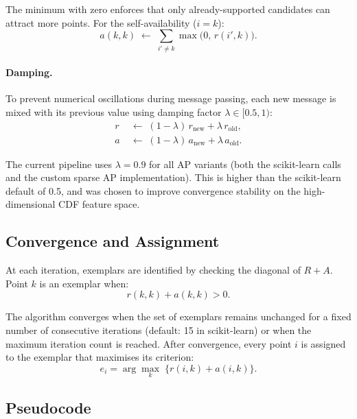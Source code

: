\documentclass[11pt]{article}
\begin{document}
The minimum with zero enforces that only already-supported candidates can attract more points. For the self-availability ($i = k$):
\begin{equation}
    a(k,k) \;\leftarrow\; \sum_{i' \neq k} \max\!\bigl(0,\, r(i',k)\bigr).
\end{equation}

\paragraph{Damping.}
To prevent numerical oscillations during message passing, each new message is mixed with its previous value using damping factor $\lambda \in [0.5, 1)$:
\begin{align}
    r &\;\leftarrow\; (1-\lambda)\,r_{\mathrm{new}} + \lambda\,r_{\mathrm{old}}, \\
    a &\;\leftarrow\; (1-\lambda)\,a_{\mathrm{new}} + \lambda\,a_{\mathrm{old}}.
\end{align}

The current pipeline uses $\lambda = 0.9$ for all AP variants (both the scikit-learn calls and the custom sparse AP implementation). This is higher than the scikit-learn default of 0.5, and was chosen to improve convergence stability on the high-dimensional CDF feature space.

\subsection{Convergence and Assignment}

At each iteration, exemplars are identified by checking the diagonal of $R + A$. Point $k$ is an exemplar when:
\begin{equation}
    r(k,k) + a(k,k) > 0.
\end{equation}

The algorithm converges when the set of exemplars remains unchanged for a fixed number of consecutive iterations (default: 15 in scikit-learn) or when the maximum iteration count is reached. After convergence, every point $i$ is assigned to the exemplar that maximises its criterion:
\begin{equation}
    e_i = \arg\max_{k}\;\bigl\{r(i,k) + a(i,k)\bigr\}.
\end{equation}

\subsection{Pseudocode}
\end{document}
